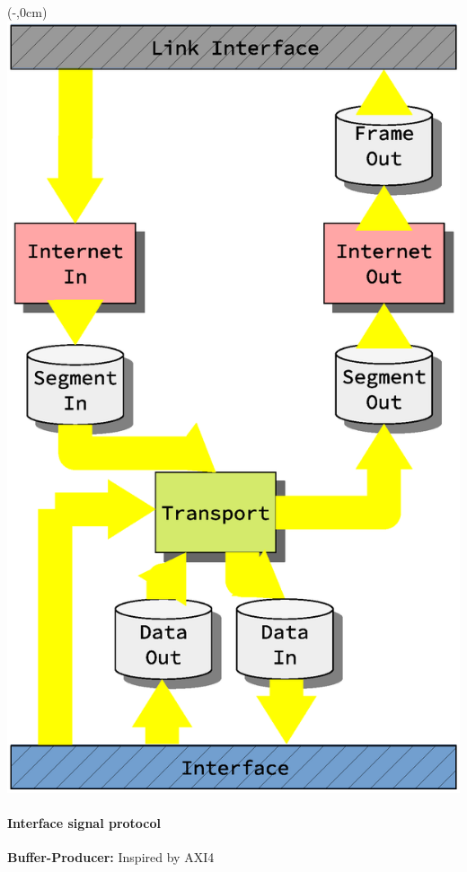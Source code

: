 \begin{frame}[fragile]
    \begin{textblock*}{\displayThumbnail}(\paperwidth-\displayThumbnail-0.2cm,0cm) %
        \colorbox{white}{\includegraphics[width=\textwidth]{implementation/design_2_busses.eps}}
    \end{textblock*}
    \frametitle{\ImplementationTitle}
    \framesubtitle{Interface signal protocol}
    \textbf{Buffer-Producer:} Inspired by AXI4\\
    \begin{columns}

\end{columns}
\end{frame}
